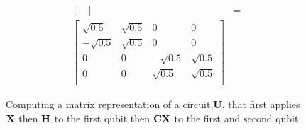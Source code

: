 \begin{figure}[H]
\begin{align*}
\begin{bmatrix}
        \end{bmatrix}
        &=\\
        \begin{bmatrix}
            \sqrt{0.5}  &  \sqrt{0.5} & 0 & 0 \\
            -\sqrt{0.5} &  \sqrt{0.5} & 0 & 0 \\
            0 & 0 & -\sqrt{0.5} & \sqrt{0.5} \\
            0 & 0 & \sqrt{0.5}  & \sqrt{0.5} \\
        \end{bmatrix}& 
    \end{align*}
    \caption{Computing a matrix representation of a circuit,$\mathbf{U}$, that first applies $\mathbf{X}$ then $\mathbf{H}$ to the first qubit then $\mathbf{CX}$ to the first and second qubit}
    \label{fig:app_circuit_matrix}
\end{figure}
